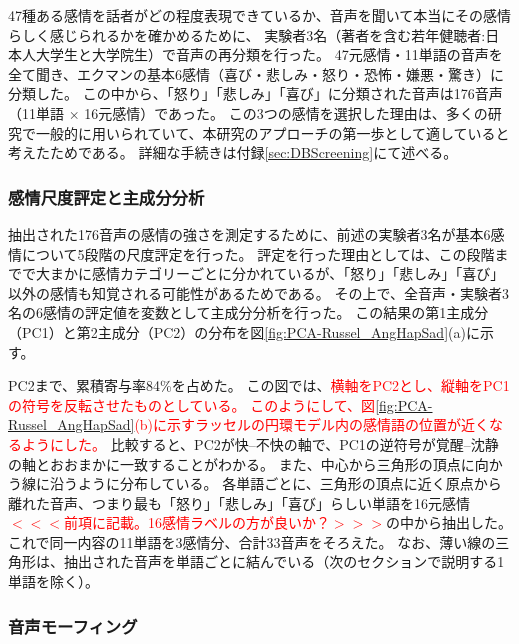 47種ある感情を話者がどの程度表現できているか、音声を聞いて本当にその感情らしく感じられるかを確かめるために、
実験者3名（著者を含む若年健聴者:日本人大学生と大学院生）で音声の再分類を行った。
47元感情・11単語の音声を全て聞き、エクマンの基本6感情（喜び・悲しみ・怒り・恐怖・嫌悪・驚き）\cite{ekman1992argument}に分類した。
この中から、「怒り」「悲しみ」「喜び」に分類された音声は176音声（11単語 $\times$ 16元感情）であった。
この3つの感情を選択した理由は、多くの研究で一般的に用いられていて、本研究のアプローチの第一歩として適していると考えたためである。
詳細な手続きは付録\ref{sec:DBScreening}にて述べる。

\newpage


\subsubsection{感情尺度評定と主成分分析}
抽出された176音声の感情の強さを測定するために、前述の実験者3名が基本6感情について5段階の尺度評定を行った。
評定を行った理由としては、この段階までで大まかに感情カテゴリーごとに分かれているが、「怒り」「悲しみ」「喜び」以外の感情も知覚される可能性があるためである。
その上で、全音声・実験者3名の6感情の評定値を変数として主成分分析を行った。
この結果の第1主成分（PC1）と第2主成分（PC2）の分布を図\ref{fig:PCA-Russel_AngHapSad}(a)に示す。

PC2まで、累積寄与率84\%を占めた。
この図では、\textcolor{red}{横軸をPC2とし、縦軸をPC1の符号を反転させたものとしている。
このようにして、図\ref{fig:PCA-Russel_AngHapSad}(b)に示すラッセルの円環モデル\cite{russell1980circumplex}内の感情語の位置が近くなるようにした。}
比較すると、PC2が快--不快の軸で、PC1の逆符号が覚醒--沈静の軸とおおまかに一致することがわかる。
また、中心から三角形の頂点に向かう線に沿うように分布している。
各単語ごとに、三角形の頂点に近く原点から離れた音声、つまり最も「怒り」「悲しみ」「喜び」らしい単語を16元感情\textcolor{red}{$<<<$前項に記載。16感情ラベルの方が良いか？$>>>$}の中から抽出した。
これで同一内容の11単語を3感情分、合計33音声をそろえた。
なお、薄い線の三角形は、抽出された音声を単語ごとに結んでいる（次のセクションで説明する1単語を除く）。





\subsubsection{音声モーフィング}
\label{sec:morphAngSadHap}

